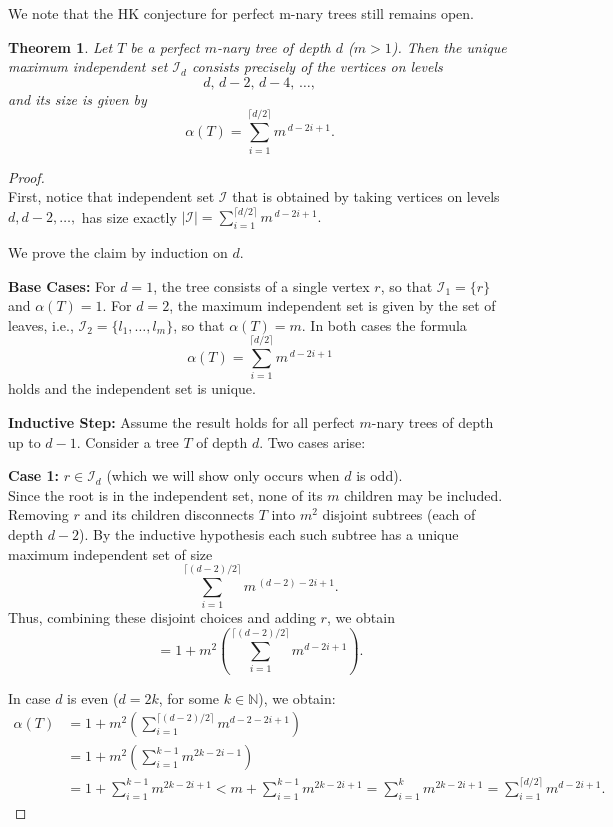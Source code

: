 \documentclass{amsart}
\newtheorem{theorem}{Theorem}[section]
\theoremstyle{definition}
\newcommand\II{{\mathcal I}}
\begin{document}
We note that the HK conjecture for perfect m-nary trees still remains open.

\begin{theorem}{\label{theorem:mnary_independence_num}}
	Let $T$ be a perfect $m$-nary tree of depth $d$ ($m>1$). Then the unique maximum independent set $\mathcal{I}_d$ consists precisely of the vertices on levels
	\[
		d,\, d-2,\, d-4,\, \dots,
	\]
	and its size is given by
	\[
		\alpha(T)=\sum_{i=1}^{\lceil d/2 \rceil} m^{\,d-2i+1}.
	\]
\end{theorem}

\begin{proof}
	$ $
	\\
	First, notice that independent set $\II$ that is obtained by taking vertices on levels $d, d-2, \ldots, $ has size exactly $|\II|=\displaystyle{\sum_{i=1}^{\lceil d/2 \rceil} m^{\,d-2i+1}}.$

	We prove the claim by induction on $d$.

	\textbf{Base Cases:}
	For $d=1$, the tree consists of a single vertex $r$, so that $\mathcal{I}_1=\{r\}$ and $\alpha(T)=1$. For $d=2$, the maximum independent set is given by the set of leaves, i.e., $\mathcal{I}_2=\{l_1,\dots,l_m\}$, so that $\alpha(T)=m$. In both cases the formula
	\[
		\alpha(T)=\sum_{i=1}^{\lceil d/2 \rceil} m^{\,d-2i+1}
	\]
	holds and the independent set is unique.

	\medskip

	\textbf{Inductive Step:}
	Assume the result holds for all perfect $m$-nary trees of depth up to $d - 1$. Consider a tree $T$ of depth $d$. Two cases arise:

	\medskip

	\textbf{Case 1:} $r\in \mathcal{I}_{d}$ (which we will show only occurs when $d$ is odd).\\[1mm]
	Since the root is in the independent set, none of its $m$ children may be included. Removing $r$ and its children disconnects $T$ into $m^2$ disjoint subtrees (each of depth $d-2$). By the inductive hypothesis each such subtree has a unique maximum independent set of size
	\[
		\sum_{i=1}^{\lceil (d-2)/2 \rceil} m^{\, (d-2)-2i+1}.
	\]
	Thus, combining these disjoint choices and adding $r$, we obtain
	\[
		= 1 + m^2\left(\sum_{i=1}^{\lceil (d-2)/2 \rceil} m^{d-2i+1}\right).
	\]

	In case $d$ is even ($d = 2k$, for some $k \in \mathbb{N}$), we obtain:
	\begin{align*}
		\alpha(T) & = 1 + m^2\left(\sum_{i=1}^{\lceil (d-2)/2 \rceil} m^{d - 2 -2i+1}\right)                                                                         \\
		          & = 1 + m^2\left(\sum_{i=1}^{k-1} m^{2k-2i-1}\right)                                                                                               \\
		          & = 1 + \sum_{i=1}^{k-1} m^{2k-2i+1} < m + \sum_{i=1}^{k-1} m^{2k-2i+1} = \sum_{i=1}^{k} m^{2k-2i+1} = \sum_{i = 1}^{\lceil d/2 \rceil}m^{d-2i+1}.
	\end{align*}


\end{proof}
\end{document}
